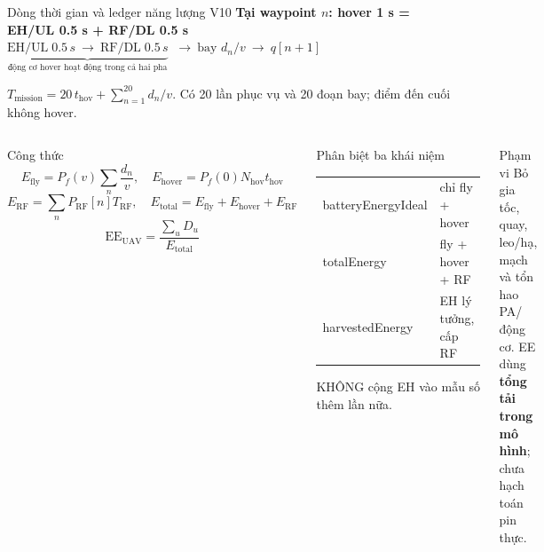 \documentclass[t,aspectratio=169]{beamer}
\newcommand{\hb}[1]{{\color{hustprimary}\textbf{#1}}}
\newcommand{\code}[1]{{\small\ttfamily #1}}
\begin{document}
\begin{frame}{Dòng thời gian và ledger năng lượng V10}
\vspace{-8pt}\setlength{\abovedisplayskip}{3pt}\setlength{\belowdisplayskip}{3pt}
  \centering
  {\small\hb{Tại waypoint $n$: hover 1 s = EH/UL 0.5 s + RF/DL 0.5 s}}\\[4pt]
  {\small $\underbrace{\boxed{\mathrm{EH/UL}\;0.5\,s}\ \longrightarrow\
  \boxed{\mathrm{RF/DL}\;0.5\,s}}_{\text{động cơ hover hoạt động trong cả hai pha}}$
  $\ \longrightarrow\ \boxed{\text{bay }d_n/v}\ \longrightarrow\ q[n+1]$}\par
  \vspace{3pt}
  {\scriptsize $T_{\mathrm{mission}}=20\,t_{\mathrm{hov}}+\sum_{n=1}^{20}d_n/v$.
  Có 20 lần phục vụ và 20 đoạn bay; điểm đến cuối không hover.}
  \vspace{4pt}
  \begin{columns}[T]
  \begin{block}{Công thức}\scriptsize
  \[ E_{\mathrm{fly}}=P_f(v)\sum_n\frac{d_n}{v},\quad
     E_{\mathrm{hover}}=P_f(0)N_{\mathrm{hov}}t_{\mathrm{hov}} \]
  \[ E_{\mathrm{RF}}=\sum_n P_{\mathrm{RF}}[n]T_{\mathrm{RF}},\quad
     E_{\mathrm{total}}=E_{\mathrm{fly}}+E_{\mathrm{hover}}+E_{\mathrm{RF}} \]
  \[ \mathrm{EE}_{\mathrm{UAV}}=\frac{\sum_u D_u}{E_{\mathrm{total}}} \]
  \end{block}
  \begin{exampleblock}{Phân biệt ba khái niệm}\scriptsize
  \begin{tabular}{@{}ll@{}}
    \code{batteryEnergyIdeal} & chỉ fly + hover\\
    \code{totalEnergy} & fly + hover + RF\\
    \code{harvestedEnergy} & EH lý tưởng, cấp RF\\
  \end{tabular}
  \vspace{3pt}
  KHÔNG cộng EH vào mẫu số thêm lần nữa.
  \end{exampleblock}
  \begin{alertblock}{Phạm vi}\scriptsize
  Bỏ gia tốc, quay, leo/hạ, mạch và tổn hao PA/động cơ. EE dùng \textbf{tổng tải trong mô hình}; chưa hạch toán pin thực.
  \end{alertblock}
  \end{columns}
\end{frame}
\end{document}
